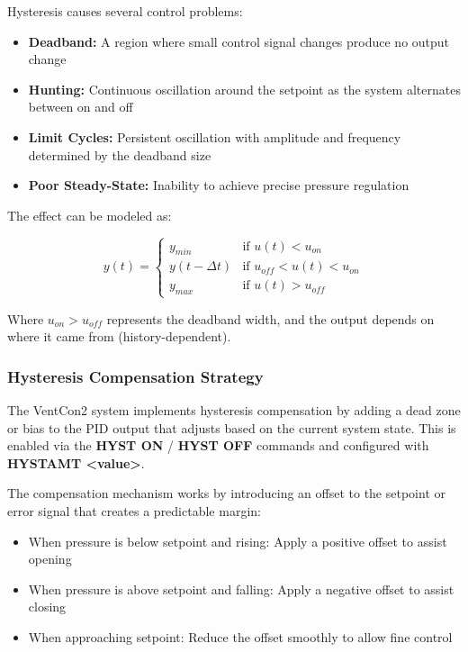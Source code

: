 Hysteresis causes several control problems:

\begin{itemize}
    \item \textbf{Deadband:} A region where small control signal changes produce no output change
    \item \textbf{Hunting:} Continuous oscillation around the setpoint as the system alternates between on and off
    \item \textbf{Limit Cycles:} Persistent oscillation with amplitude and frequency determined by the deadband size
    \item \textbf{Poor Steady-State:} Inability to achieve precise pressure regulation
\end{itemize}

The effect can be modeled as:

\begin{equation}
y(t) = \begin{cases}
y_{min} & \text{if } u(t) < u_{on} \\
y(t-\Delta t) & \text{if } u_{off} < u(t) < u_{on} \\
y_{max} & \text{if } u(t) > u_{off}
\end{cases}
\end{equation}

Where $u_{on} > u_{off}$ represents the deadband width, and the output depends on where it came from (history-dependent).

\subsubsection{Hysteresis Compensation Strategy}
The VentCon2 system implements hysteresis compensation by adding a dead zone or bias to the PID output that adjusts based on the current system state. This is enabled via the \textbf{HYST ON} / \textbf{HYST OFF} commands and configured with \textbf{HYSTAMT <value>}.

The compensation mechanism works by introducing an offset to the setpoint or error signal that creates a predictable margin:

\begin{itemize}
    \item When pressure is below setpoint and rising: Apply a positive offset to assist opening
    \item When pressure is above setpoint and falling: Apply a negative offset to assist closing
    \item When approaching setpoint: Reduce the offset smoothly to allow fine control
\end{itemize}


